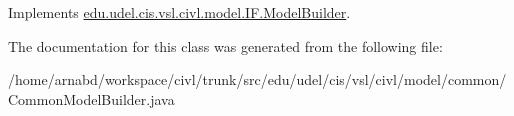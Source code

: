 Implements \hyperlink{interfaceedu_1_1udel_1_1cis_1_1vsl_1_1civl_1_1model_1_1IF_1_1ModelBuilder_a61841829989ab5bbefbff27e65103e84}{edu.\+udel.\+cis.\+vsl.\+civl.\+model.\+I\+F.\+Model\+Builder}.



The documentation for this class was generated from the following file\+:\begin{DoxyCompactItemize}
\item 
/home/arnabd/workspace/civl/trunk/src/edu/udel/cis/vsl/civl/model/common/Common\+Model\+Builder.\+java\end{DoxyCompactItemize}
